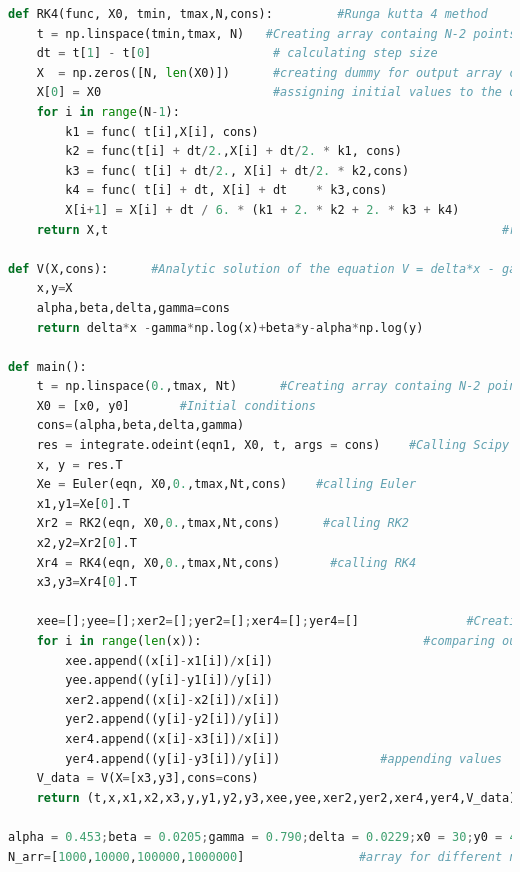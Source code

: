 \documentclass[12pt]{article}
\begin{document}
\begin{lstlisting}[language=Python, caption=Python example]
def RK4(func, X0, tmin, tmax,N,cons):         #Runga kutta 4 method
    t = np.linspace(tmin,tmax, N)   #Creating array containg N-2 points between tmin and tmax (Basically calculation points)
    dt = t[1] - t[0]                 # calculating step size
    X  = np.zeros([N, len(X0)])      #creating dummy for output array containing x,y values
    X[0] = X0                        #assigning initial values to the output array
    for i in range(N-1):
        k1 = func( t[i],X[i], cons)
        k2 = func(t[i] + dt/2.,X[i] + dt/2. * k1, cons)
        k3 = func( t[i] + dt/2., X[i] + dt/2. * k2,cons)
        k4 = func( t[i] + dt, X[i] + dt    * k3,cons)
        X[i+1] = X[i] + dt / 6. * (k1 + 2. * k2 + 2. * k3 + k4)           #Updating values of the dummy array that we created 
    return X,t                                                       #returns array of updated values of X and array t

def V(X,cons):      #Analytic solution of the equation V = delta*x - gamma*ln(x)+beta*y-alpha*ln(y)   
    x,y=X
    alpha,beta,delta,gamma=cons
    return delta*x -gamma*np.log(x)+beta*y-alpha*np.log(y)

def main():
    t = np.linspace(0.,tmax, Nt)      #Creating array containg N-2 points between tmin and tmax (Basically calculation points)
    X0 = [x0, y0]       #Initial conditions
    cons=(alpha,beta,delta,gamma)
    res = integrate.odeint(eqn1, X0, t, args = cons)    #Calling Scipy's odeint function
    x, y = res.T
    Xe = Euler(eqn, X0,0.,tmax,Nt,cons)    #calling Euler
    x1,y1=Xe[0].T
    Xr2 = RK2(eqn, X0,0.,tmax,Nt,cons)      #calling RK2
    x2,y2=Xr2[0].T
    Xr4 = RK4(eqn, X0,0.,tmax,Nt,cons)       #calling RK4
    x3,y3=Xr4[0].T

    xee=[];yee=[];xer2=[];yer2=[];xer4=[];yer4=[]               #Creating empty lists for appending values of abs(odeint-numrical method(euler/rk2/rk4))/odeint
    for i in range(len(x)):                               #comparing our results of Euler,RK2,RK4 with Scipy's ODEint for finding error
        xee.append((x[i]-x1[i])/x[i])
        yee.append((y[i]-y1[i])/y[i])
        xer2.append((x[i]-x2[i])/x[i])
        yer2.append((y[i]-y2[i])/y[i])
        xer4.append((x[i]-x3[i])/x[i])
        yer4.append((y[i]-y3[i])/y[i])              #appending values 
    V_data = V(X=[x3,y3],cons=cons)
    return (t,x,x1,x2,x3,y,y1,y2,y3,xee,yee,xer2,yer2,xer4,yer4,V_data) 
                   
alpha = 0.453;beta = 0.0205;gamma = 0.790;delta = 0.0229;x0 = 30;y0 = 4;tmax = 100        #Assigning values of initial conditions,parameters
N_arr=[1000,10000,100000,1000000]                #array for different number of steps


\end{lstlisting}
\end{document}
